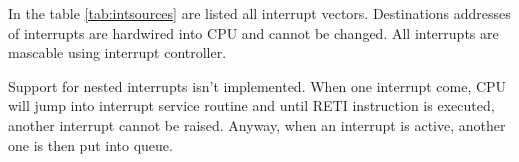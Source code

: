 In the table \ref{tab:intsources} are listed all interrupt vectors. Destinations
addresses of interrupts are hardwired into CPU and cannot be changed. All
interrupts are mascable using interrupt controller.

Support for nested interrupts isn't implemented. When one interrupt come, CPU
will jump into interrupt service routine and until RETI instruction is executed,
another interrupt cannot be raised. Anyway, when an interrupt is active, another
one is then put into queue.
